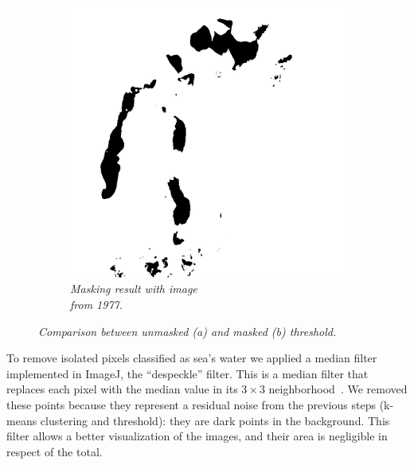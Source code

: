 \begin{figure}[H]
\begin{subfigure}[b]{.45\textwidth}
        \includegraphics[width=\textwidth]{../img/2015w.jpg}
        \caption{\emph{Masking result with image \\from 1977.}}
    \end{subfigure}
    \caption{\emph{Comparison between unmasked (a) and masked (b) threshold.}}
    \label{fig:masking}
\end{figure}
To remove isolated pixels classified as sea's water we applied a median filter implemented in ImageJ, the ``despeckle'' filter. 
This is a median filter that replaces each pixel with the median value in its $3 \times 3$ neighborhood~\cite{despeckle}.
We removed these points because they represent a residual noise from the previous steps (k-means clustering and threshold): they are dark points in the background. 
This filter allows a better visualization of the images, and their area is negligible in respect of the total.

